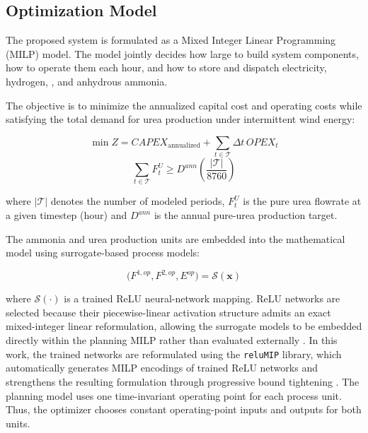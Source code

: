\documentclass[letterpaper]{article}
\begin{document}
\subsection{Optimization Model}
The proposed system is formulated as a Mixed Integer Linear
Programming (MILP) model. The model jointly decides how large to
build system components, how to operate them each hour, and how to
store and dispatch electricity, hydrogen, , and anhydrous
ammonia.

The objective is to minimize the annualized capital cost and
operating costs while satisfying the total demand for urea production
under intermittent wind energy:

\begin{equation}
\min Z = CAPEX_{\mathrm{annualized}} + \sum_{t \in \mathcal{T}} \Delta t \, OPEX_t
\end{equation}
\begin{equation}
\sum_{t \in \mathcal{T}}F^U_t \ge D^{ann}\left(\frac{|\mathcal{T}|}{8760}\right)
\end{equation}

\noindent where $|\mathcal{T}|$ denotes the number of modeled
periods, $F^U_t$ is the pure urea flowrate at a given timestep (hour)
and $D^{ann}$ is the annual pure-urea production target.

The ammonia and urea production units are embedded into the
mathematical model using surrogate-based process models:

\begin{equation}
\big(F^{1,op}, F^{2,op}, E^{op}\big) = \mathcal{S}(\mathbf{x})
\end{equation}

\noindent where $\mathcal{S}(\cdot)$ is a trained ReLU neural-network
mapping. ReLU networks are selected because their piecewise-linear
activation structure admits an exact mixed-integer linear
reformulation, allowing the surrogate models to be embedded directly
within the planning MILP rather than evaluated externally
\cite{Grimstad2019ReLU,Anderson2020Strong}. In this work, the trained
networks are reformulated using the \texttt{reluMIP} library, which
automatically generates MILP encodings of trained ReLU networks and
strengthens the resulting formulation through progressive bound
tightening \cite{Lueg2021reluMIP}. The planning model uses one
time-invariant operating point for each process unit. Thus, the
optimizer chooses constant operating-point inputs and outputs for
both units.
\end{document}
